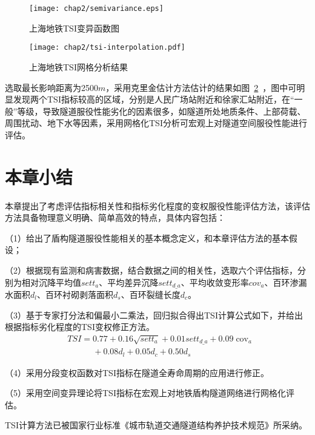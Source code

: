 \begin{figure}[htb!]
    \centering
    \texttt{[image: chap2/semivariance.eps]}
    \caption{上海地铁TSI变异函数图}
    \label{fig:上海地铁TSI变异函数图}
\end{figure}

\begin{figure}[htb!]
    \centering
    \texttt{[image: chap2/tsi-interpolation.pdf]}
    \caption{上海地铁TSI网格分析结果}
    \label{fig:上海地铁TSI网格分析结果}
\end{figure}

选取最长影响距离为2500$m$，采用克里金估计方法估计的结果如图~\ref{fig:上海地铁TSI网格分析结果}~，图中可明显发现两个TSI指标较高的区域，分别是人民广场站附近和徐家汇站附近，在“一般”等级，导致隧道服役性能劣化的因素很多，如隧道所处地质条件、上部荷载、周围扰动、地下水等因素，采用网格化TSI分析可宏观上对隧道空间服役性能进行评估。

\section{本章小结}

本章提出了考虑评估指标相关性和指标劣化程度的变权服役性能评估方法，该评估方法具备物理意义明确、简单高效的特点，具体内容包括：

（1）给出了盾构隧道服役性能相关的基本概念定义，和本章评估方法的基本假设；

（2）根据现有监测和病害数据，结合数据之间的相关性，选取六个评估指标，分别为相对沉降平均值${sett}_{a}$、平均差异沉降$set{{t}_{d\_a}}$、平均收敛变形率${cov}_{a}$、百环渗漏水面积${d}_{l}$、百环衬砌剥落面积${d}_{s}$、百环裂缝长度${d}_{c}$。

（3）基于专家打分法和偏最小二乘法，回归拟合得出TSI计算公式如下，并给出根据指标劣化程度的TSI变权修正方法。
\begin{align}
  & TSI=0.77+0.16\sqrt{set{{t}_{a}}}+0.01set{{t}_{d\_a}}+0.09{{\operatorname{cov}}_{a}} \nonumber \\ 
 & \quad \quad \quad +0.08{{d}_{l}}+0.05{{d}_{c}}+0.50{{d}_{s}} \nonumber 
\end{align}

（4）采用分段变权函数对TSI指标在隧道全寿命周期的应用进行修正。

（5）采用空间变异理论将TSI指标在宏观上对地铁盾构隧道网络进行网格化评估。

TSI计算方法已被国家行业标准《城市轨道交通隧道结构养护技术规范》所采纳。

